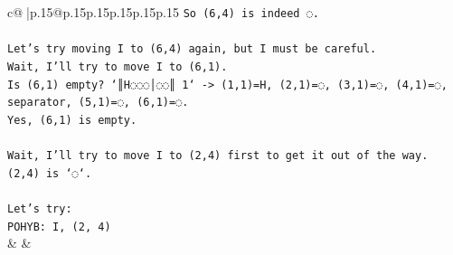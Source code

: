 \documentclass{article}
\begin{document}
{\begin{supertabular}{c@{$\;$}|p{.15\linewidth}@{}p{.15\linewidth}p{.15\linewidth}p{.15\linewidth}p{.15\linewidth}p{.15\linewidth}}
{{{\texttt{So (6,4) is indeed ◌.} \\
\\ 
\texttt{Let's try moving I to (6,4) again, but I must be careful.} \\
\texttt{Wait, I'll try to move I to (6,1).} \\
\texttt{Is (6,1) empty? `║H◌◌◌│◌◌║ 1` {-}> (1,1)=H, (2,1)=◌, (3,1)=◌, (4,1)=◌, separator, (5,1)=◌, (6,1)=◌.} \\
\texttt{Yes, (6,1) is empty.} \\
\\ 
\texttt{Wait, I'll try to move I to (2,4) first to get it out of the way.} \\
\texttt{(2,4) is `◌`.} \\
\\ 
\texttt{Let's try:} \\
\texttt{POHYB: I, (2, 4)} \\
            }
        }
    }
    & & \\ \\


\end{supertabular}}
\end{document}
